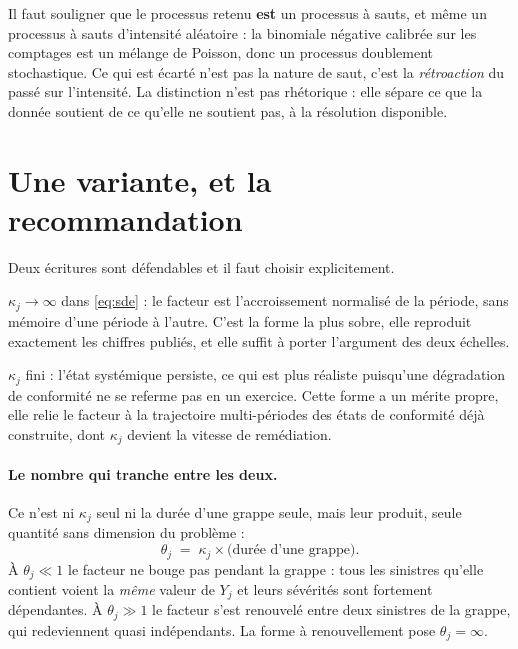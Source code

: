 \documentclass[11pt,a4paper]{article}
\begin{document}
Il faut souligner que le processus retenu \textbf{est} un processus à sauts, et même un
processus à sauts d'intensité aléatoire : la binomiale négative calibrée sur les comptages
est un mélange de Poisson, donc un processus doublement stochastique. Ce qui est écarté
n'est pas la nature de saut, c'est la \emph{rétroaction} du passé sur l'intensité. La
distinction n'est pas rhétorique : elle sépare ce que la donnée soutient de ce qu'elle ne
soutient pas, à la résolution disponible.

\section{Une variante, et la recommandation}

Deux écritures sont défendables et il faut choisir explicitement.

\begin{description}[itemsep=3pt,topsep=3pt]
\item[Forme à renouvellement.] $\kappa_j \to \infty$ dans \eqref{eq:sde} : le facteur est
      l'accroissement normalisé de la période, sans mémoire d'une période à l'autre. C'est
      la forme la plus sobre, elle reproduit exactement les chiffres publiés, et elle
      suffit à porter l'argument des deux échelles.
\item[Forme à mémoire.] $\kappa_j$ fini : l'état systémique persiste, ce qui est plus
      réaliste puisqu'une dégradation de conformité ne se referme pas en un exercice. Cette
      forme a un mérite propre, elle relie le facteur à la trajectoire multi-périodes des
      états de conformité déjà construite, dont $\kappa_j$ devient la vitesse de
      remédiation.
\end{description}


\paragraph{Le nombre qui tranche entre les deux.} Ce n'est ni $\kappa_j$ seul ni la durée
d'une grappe seule, mais leur produit, seule quantité sans dimension du problème :
\begin{equation}
\label{eq:dimensionless}
  \theta_j \;=\; \kappa_j \times \text{(durée d'une grappe)} .
\end{equation}
À $\theta_j \ll 1$ le facteur ne bouge pas pendant la grappe : tous les sinistres qu'elle
contient voient la \emph{même} valeur de $Y_j$ et leurs sévérités sont fortement dépendantes.
À $\theta_j \gg 1$ le facteur s'est renouvelé entre deux sinistres de la grappe, qui
redeviennent quasi indépendants. La forme à renouvellement pose $\theta_j = \infty$.
\end{document}

